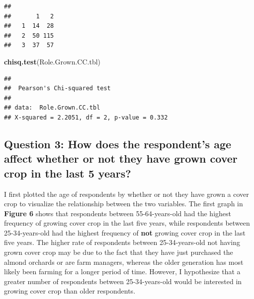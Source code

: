 \documentclass[12pt,]{article}
\newenvironment{Shaded}{\begin{snugshade}}{\end{snugshade}}
\newcommand{\KeywordTok}[1]{\textcolor[rgb]{0.13,0.29,0.53}{\textbf{#1}}}
\newcommand{\NormalTok}[1]{#1}
\begin{document}
\begin{verbatim}
##    
##       1   2
##   1  14  28
##   2  50 115
##   3  37  57
\end{verbatim}

\begin{Shaded}
\begin{Highlighting}[]
\KeywordTok{chisq.test}\NormalTok{(Role.Grown.CC.tbl)}
\end{Highlighting}
\end{Shaded}

\begin{verbatim}
## 
##  Pearson's Chi-squared test
## 
## data:  Role.Grown.CC.tbl
## X-squared = 2.2051, df = 2, p-value = 0.332
\end{verbatim}

\subsection{Question 3: How does the respondent's age affect whether or
not they have grown cover crop in the last 5
years?}\label{question-3-how-does-the-respondents-age-affect-whether-or-not-they-have-grown-cover-crop-in-the-last-5-years}

I first plotted the age of respondents by whether or not they have grown
a cover crop to visualize the relationship between the two variables.
The first graph in \textbf{Figure 6} shows that respondents between
55-64-years-old had the highest frequency of growing cover crop in the
last five years, while respondents between 25-34-years-old had the
highest frequency of \textbf{not} growing cover crop in the last five
years. The higher rate of respondents between 25-34-years-old not having
grown cover crop may be due to the fact that they have just purchased
the almond orchards or are farm managers, whereas the older generation
has most likely been farming for a longer period of time. However, I
hypothesize that a greater number of respondents between 25-34-years-old
would be interested in growing cover crop than older respondents.

  \providecommand{\huxb}[2]{\arrayrulecolor[RGB]{#1}\global\arrayrulewidth=#2pt}
  \providecommand{\huxvb}[2]{\color[RGB]{#1}\vrule width #2pt}
  \providecommand{\huxtpad}[1]{\rule{0pt}{\baselineskip+#1}}
  \providecommand{\huxbpad}[1]{\rule[-#1]{0pt}{#1}}
\end{document}
